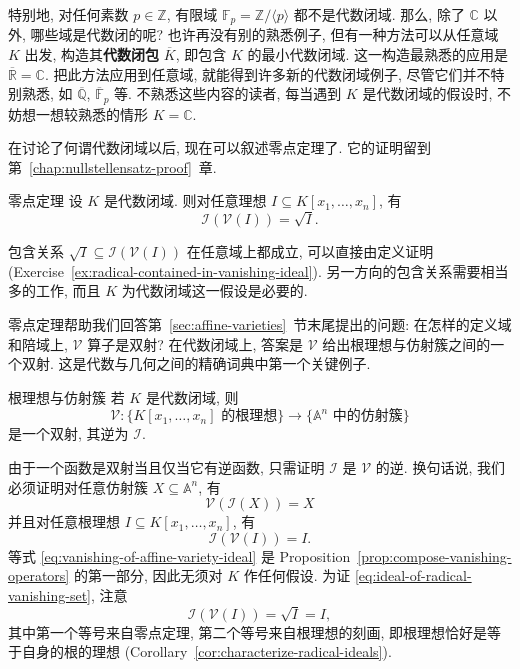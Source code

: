 特别地, 对任何素数 $p\in\mathbb{Z}$, 有限域 $\mathbb{F}_{p}=\mathbb{Z}/\langle p\rangle$ 都不是代数闭域. 那么, 除了 $\mathbb{C}$ 以外, 哪些域是代数闭的呢? 也许再没有别的熟悉例子, 但有一种方法可以从任意域 $K$ 出发, 构造其\textbf{代数闭包} $\overline{K}$, 即包含 $K$ 的最小代数闭域. 这一构造最熟悉的应用是 $\overline{\mathbb{R}}=\mathbb{C}$. 把此方法应用到任意域, 就能得到许多新的代数闭域例子, 尽管它们并不特别熟悉, 如 $\overline{\mathbb{Q}}$, $\overline{\mathbb{F}}_{p}$ 等. 不熟悉这些内容的读者, 每当遇到 $K$ 是代数闭域的假设时, 不妨想一想较熟悉的情形 $K=\mathbb{C}$.

在讨论了何谓代数闭域以后, 现在可以叙述零点定理了. 它的证明留到第~\ref{chap:nullstellensatz-proof}~章.

\begin{Theorem}{零点定理}\leavevmode\label{thm:nullstellensatz}
  设 $K$ 是代数闭域. 则对任意理想 $I\subseteq K[x_{1},\ldots,x_{n}]$, 有
  \[
    \mathcal{I}(\mathcal{V}(I))=\sqrt{I}.
  \]
\end{Theorem}

包含关系 $\sqrt{I}\subseteq\mathcal{I}(\mathcal{V}(I))$ 在任意域上都成立, 可以直接由定义证明 (Exercise~\ref{ex:radical-contained-in-vanishing-ideal}). 另一方向的包含关系需要相当多的工作, 而且 $K$ 为代数闭域这一假设是必要的.

零点定理帮助我们回答第~\ref{sec:affine-varieties}~节末尾提出的问题: 在怎样的定义域和陪域上, $\mathcal{V}$ 算子是双射? 在代数闭域上, 答案是 $\mathcal{V}$ 给出根理想与仿射簇之间的一个双射. 这是代数与几何之间的精确词典中第一个关键例子.

\begin{Corollary}{根理想与仿射簇}\leavevmode\label{cor:radical-ideals-affine-varieties-bijection}
  若 $K$ 是代数闭域, 则
  \[
    \mathcal{V}:\{K[x_{1},\ldots,x_{n}]\text{ 的根理想}\}
      \longrightarrow\{\mathbb{A}^{n}\text{ 中的仿射簇}\}
  \]
  是一个双射, 其逆为 $\mathcal{I}$.
\end{Corollary}

\begin{Proof}
  由于一个函数是双射当且仅当它有逆函数, 只需证明 $\mathcal{I}$ 是 $\mathcal{V}$ 的逆. 换句话说, 我们必须证明对任意仿射簇 $X\subseteq\mathbb{A}^{n}$, 有
  \begin{equation}\label{eq:vanishing-of-affine-variety-ideal}
    \mathcal{V}(\mathcal{I}(X))=X
  \end{equation}
  并且对任意根理想 $I\subseteq K[x_{1},\ldots,x_{n}]$, 有
  \begin{equation}\label{eq:ideal-of-radical-vanishing-set}
    \mathcal{I}(\mathcal{V}(I))=I.
  \end{equation}
  等式 \eqref{eq:vanishing-of-affine-variety-ideal} 是 Proposition~\ref{prop:compose-vanishing-operators} 的第一部分, 因此无须对 $K$ 作任何假设. 为证 \eqref{eq:ideal-of-radical-vanishing-set}, 注意
  \[
    \mathcal{I}(\mathcal{V}(I))=\sqrt{I}=I,
  \]
  其中第一个等号来自零点定理, 第二个等号来自根理想的刻画, 即根理想恰好是等于自身的根的理想 (Corollary~\ref{cor:characterize-radical-ideals}).
\end{Proof}

